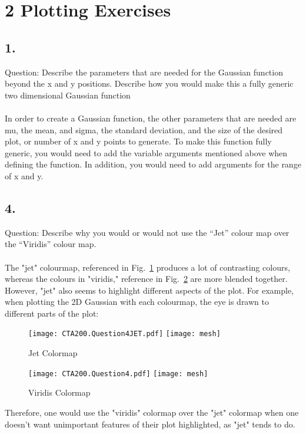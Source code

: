\documentclass[12pt, letterpaper]{article}
\begin{document}
\section*{2 Plotting Exercises}

\subsection*{   1.}
Question: Describe the parameters that are needed for the Gaussian function
beyond the x and y positions. Describe how you would make this a fully generic two dimensional Gaussian function\\
\\
In order to create a Gaussian function, the other parameters that are needed are mu, the mean, and sigma, the standard deviation, and the size of the desired plot, or number of x and y points to generate. To make this function fully generic, you would need to add the variable arguments mentioned above when defining the function. In addition, you would need to add arguments for the range of x and y. 
\subsection*{   4.}
Question: Describe why you would or would
not use the “Jet” colour map over the “Viridis” colour map.\\
\\
The "jet" colourmap, referenced in Fig.~\ref{fig:mesh2} produces a lot of contrasting colours, whereas the colours in "viridis," reference in Fig.~\ref{fig:mesh3} are more blended together. However, "jet" also seems to highlight different aspects of the plot. For example, when plotting the 2D Gaussian with each colourmap, the eye is drawn to different parts of the plot: 
\begin{figure}[H]
\texttt{[image: CTA200.Question4JET.pdf]}
\centering
    \texttt{[image: mesh]}
    \caption{Jet Colormap}
    \label{fig:mesh2}
\end{figure}
\begin{figure}[H]
\texttt{[image: CTA200.Question4.pdf]}
\centering
    \texttt{[image: mesh]}
    \caption{Viridis Colormap}
    \label{fig:mesh3}
\end{figure}
Therefore, one would use the "viridis" colormap over the "jet" colormap when one doesn't want unimportant features of their plot highlighted, as "jet" tends to do. 
\end{document}
